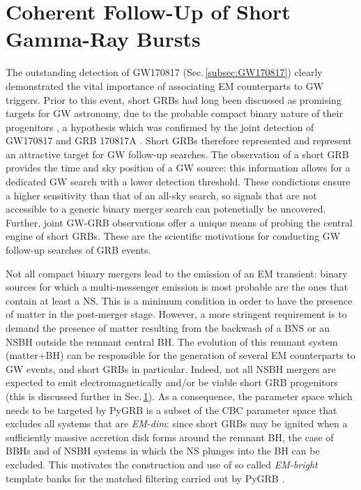 \documentclass[binding=0.6cm, LaM]{sapthesis}
\begin{document}
\section{Coherent Follow-Up of Short Gamma-Ray Bursts}
\label{sec:grbfollowup}
	The outstanding detection of GW170817 (Sec.\,\ref{subsec:GW170817}) 
        clearly demonstrated the vital importance of associating EM counterparts to GW triggers.
        Prior to this event, short GRBs had long been discussed as promising targets for GW astronomy,
        due to the probable compact binary nature of their progenitors \cite{154},
        a hypothesis which was confirmed by the joint detection of GW170817 and GRB 170817A \cite{55}.
	Short GRBs therefore represented and represent an attractive target for GW follow-up searches. 
	The observation of a short GRB provides the time and sky position of a GW source:
	this information allows for a dedicated GW search with a lower detection threshold.
        These condictions ensure a higher sensitivity than
        that of an all-sky search, so signals that are not accessible to
        a generic binary merger search can potenetially be uncovered.
        Further, joint GW-GRB observations offer a unique means of probing the central engine of short GRBs.
        These are the scientific motivations for conducting GW follow-up searches of GRB events.

	Not all compact binary mergers lead to the emission of an EM transient:
        binary sources for which a multi-messenger emission is most probable are the ones that contain at least a NS.
        This is a minimum condition in order to have the presence of matter in the post-merger stage.
        However, a more stringent requirement is to demand
        the presence of matter resulting from the backwash of a BNS or an NSBH
        outside the remnant central BH.
        The evolution of this remnant system (matter+BH) can be responsible for the generation of several EM counterparts to GW events, and short GRBs in particular.
        Indeed, not all NSBH mergers are expected to emit electromagnetically and/or be viable short GRB progenitors (this is discussed further in Sec.\,\ref{sec:grbfollowup}).
        As a consequence, the parameter space which needs to be targeted by {\ttfamily PyGRB}
        is a subset of the CBC parameter space that excludes all systems that are \textit{EM-dim}:
        since short GRBs may be ignited when a sufficiently massive accretion disk forms around the remnant BH,
        the case of BBHs and of NSBH systems in which the NS plunges into the BH can be excluded.
        This motivates the construction and use of
        so called \textit{EM-bright} template banks for the matched filtering carried out by {\ttfamily PyGRB} \cite{162}.
\end{document}
